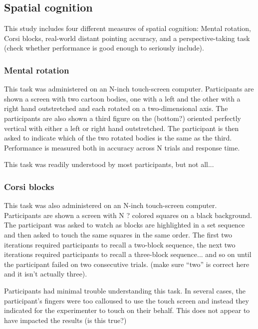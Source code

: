	\subsection{Spatial cognition}
	\label{sec:2.2}
This study includes four different measures of spatial cognition: Mental rotation, Corsi blocks, real-world distant pointing accuracy, and a perspective-taking task (check whether performance is good enough to seriously include).

		\subsubsection{Mental rotation}
		\label{sec:2.2.1}		
This task was administered on an N-inch touch-screen computer.  Participants are shown a screen with two cartoon bodies, one with a left and the other with a right hand outstretched and each rotated on a two-dimensional axis.  The participants are also shown a third figure on the (bottom?) oriented perfectly vertical with either a left or right hand outstretched.  The participant is then asked to indicate which of the two rotated bodies is the same as the third.  Performance is measured both in accuracy across N trials and response time.

This task was readily understood by most participants, but not all...		
	
		\subsubsection{Corsi blocks}
		\label{sec:2.2.2}
This task was also administered on an N-inch touch-screen computer.  Participants are shown a screen with N ? colored squares on a black background.  The participant was asked to watch as blocks are highlighted in a set sequence and then asked to touch the same squares in the same order.  The first two iterations required participants to recall a two-block sequence, the next two iterations required participants to recall a three-block sequence... and so on until the participant failed on two consecutive trials. (make sure ``two'' is correct here and it isn't actually three).

Participants had minimal trouble understanding this task.  In several cases, the participant's fingers were too calloused to use the touch screen and instead they indicated for the experimenter to touch on their behalf.  This does not appear to have impacted the results (is this true?)    		
		
		
